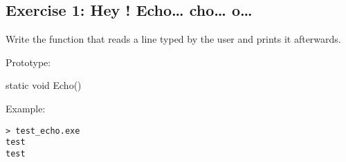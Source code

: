 \subsection{Exercise 1: Hey ! Echo\ldots{} cho\dots{} o\dots}

Write the  function that reads a line typed by the user and prints it afterwards.

Prototype:
\begin{code}
static void Echo()
\end{code}

Example:
\begin{verbatim}
> test_echo.exe
test
test
\end{verbatim}
